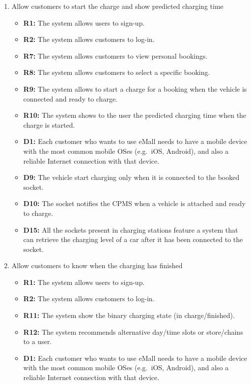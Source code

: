 \begin{enumerate}[label=\textbf{-G\arabic*}:]
{\begin{itemize}
          \end{itemize}
          }
    \item {Allow customers to start the charge and show predicted charging time
          \begin{itemize}
            \item \textbf{R1:} The system allows users to sign-up.
            \item \textbf{R2:} The system allows customers to log-in.
            \item \textbf{R7:} The system allows customers to view personal bookings.
            \item \textbf{R8:} The system allows customers to select a specific booking.
            \item \textbf{R9:} The system allows to start a charge for a booking when the vehicle is connected and ready to charge.
            \item \textbf{R10:} The system shows to the user the predicted charging time when the charge is started.
            \item \textbf{D1:} Each customer who wants to use eMall needs to have a mobile device with the most common mobile OSes (e.g.\ iOS, Android), and also a reliable Internet connection with that device.
            \item \textbf{D9:} The vehicle start charging only when it is connected to the booked socket.
            \item \textbf{D10:} The socket notifies the CPMS when a vehicle is attached and ready to charge.
            \item \textbf{D15:} All the sockets present in charging stations feature a system that can retrieve the charging level of a car after it has been connected to the socket.
          \end{itemize}
          }
    \item {Allow customers to know when the charging has finished
          \begin{itemize}
            \item \textbf{R1:} The system allows users to sign-up.
            \item \textbf{R2:} The system allows customers to log-in.
            \item \textbf{R11:} The system show the binary charging state (in charge/finished).
            \item \textbf{R12:} The system recommends alternative day/time slots or store/chains to a user.
            \item \textbf{D1:} Each customer who wants to use eMall needs to have a mobile device with the most common mobile OSes (e.g.\ iOS, Android), and also a reliable Internet connection with that device.

\end{itemize}}
\end{enumerate}

